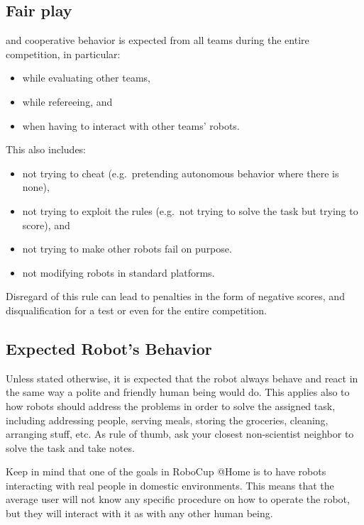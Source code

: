 \subsection{Fair play}
\label{rule:fairplay}
 and cooperative behavior is expected from all teams during the entire competition, in particular:
\begin{itemize}
	\item while evaluating other teams, 
	\item while refereeing, and 
	\item when having to interact with other teams' robots.  
\end{itemize}
This also includes:
\begin{itemize}
	\item not trying to cheat (e.g.~pretending autonomous behavior where there is none), 
	\item not trying to exploit the rules (e.g.~not trying to solve the task but trying to score), and 
	\item not trying to make other robots fail on purpose. 
	\item not modifying robots in standard platforms. 
\end{itemize}
Disregard of this rule can lead to penalties in the form of negative scores, and disqualification for a test or even for the entire competition. 

\subsection{Expected Robot's Behavior}
Unless stated otherwise, it is expected that the robot always behave and react in the same way a polite and friendly human being would do. This applies also to how robots should address the problems in order to solve the assigned task, including addressing people, serving meals, storing the groceries, cleaning, arranging stuff, etc. As rule of thumb, ask your closest non-scientist neighbor to solve the task and take notes.

Keep in mind that one of the goals in RoboCup @Home is to have robots interacting with real people in domestic environments. This means that the average user will not know any specific procedure on how to operate the robot, but they will interact with it as with any other human being.


